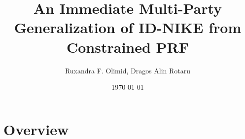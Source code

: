 \documentclass{beamer}
\title[University of Bucharest]{An Immediate Multi-Party Generalization of ID-NIKE from Constrained PRF}
\author{Ruxandra F. Olimid, Dragos Alin Rotaru} %
\institute[] %
{
University of Bucharest\\ %
}
\date{\today} %
\begin{document}
\begin{frame}
\titlepage %
\end{frame}



\section{Overview} %
\end{document}

